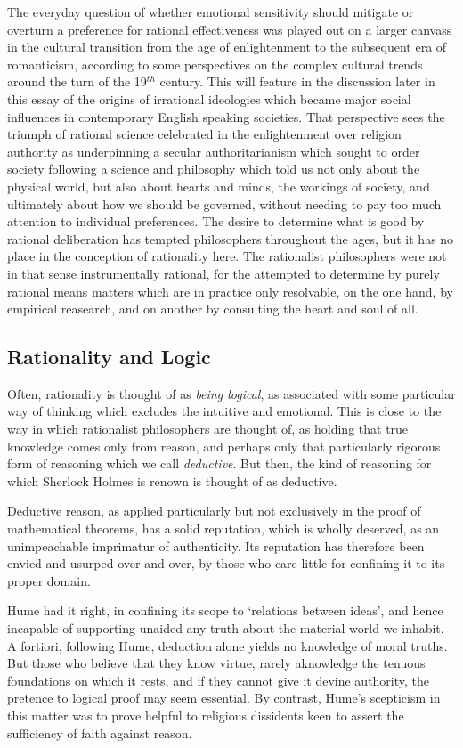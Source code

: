 \documentclass[10pt,titlepage]{book}
\begin{document}
The everyday question of whether emotional sensitivity should mitigate or overturn a preference for rational effectiveness was played out on a larger canvass in the cultural transition from the age of enlightenment to the subsequent era of romanticism, according to some perspectives on the complex cultural trends around the turn of the 19$^{th}$ century.
This will feature in the discussion later in this essay of the origins of irrational ideologies which became major social influences in contemporary English speaking societies.
That perspective sees the triumph of rational science celebrated in the enlightenment over religion authority as underpinning a secular authoritarianism which sought to order society following a science and philosophy which told us not only about the physical world, but also about hearts and minds, the workings of society, and ultimately about how we should be governed, without needing to pay too much attention to individual preferences.
The desire to determine what is good by rational deliberation has tempted philosophers throughout the ages, but it has no place in the conception of rationality here.
The rationalist philosophers were not in that sense instrumentally rational, for the attempted to determine by purely rational means matters which are in practice only resolvable, on the one hand, by empirical reasearch, and on another by consulting the heart and soul of all.

\subsection{Rationality and Logic}

Often, rationality is thought of as \emph{being logical}, as associated with some particular way of thinking which excludes the intuitive and emotional.
This is close to the way in which rationalist philosophers are thought of, as holding that true knowledge comes only from reason, and perhaps only that particularly rigorous form of reasoning which we call \emph{deductive}.
But then, the kind of reasoning for which Sherlock Holmes is renown is thought of as deductive.

Deductive reason, as applied particularly but not exclusively in the proof of mathematical theorems, has a solid reputation, which is wholly deserved, as an unimpeachable imprimatur of authenticity.
Its reputation has therefore been envied and usurped over and over, by those who care little for confining it to its proper domain.

Hume had it right, in confining its scope to `relations between ideas', and hence incapable of supporting unaided any truth about the material world we inhabit.
A fortiori, following Hume, deduction alone yields no knowledge of moral truths.
But those who believe that they know virtue, rarely aknowledge the tenuous foundations on which it rests, and if they cannot give it devine authority, the pretence to logical proof may seem essential.
By contrast, Hume's scepticism in this matter was to prove helpful to religious dissidents keen to assert the sufficiency of faith against reason.
\end{document}
